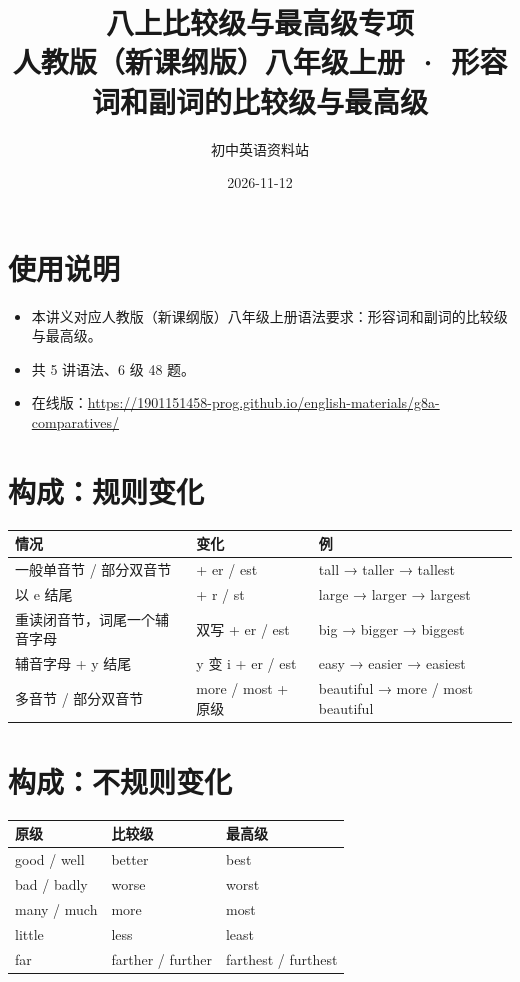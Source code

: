 \documentclass[11pt,a4paper]{ctexart}
\title{\textbf{八上比较级与最高级专项}\\[4pt]
\large 人教版（新课纲版）八年级上册 · 形容词和副词的比较级与最高级}
\author{初中英语资料站}
\date{2026-11-12}
\begin{document}
\maketitle

\section*{使用说明}
\begin{itemize}[leftmargin=1.4em]
\item 本讲义对应人教版（新课纲版）八年级上册语法要求：形容词和副词的比较级与最高级。
\item 共 5 讲语法、6 级 48 题。
\item 在线版：\url{https://1901151458-prog.github.io/english-materials/g8a-comparatives/}
\end{itemize}

\section{构成：规则变化}
\begin{center}
\begin{tabular}{p{4.4cm}p{4.0cm}p{5.2cm}}
\hline
\textbf{情况} & \textbf{变化} & \textbf{例}\\
\hline
一般单音节 / 部分双音节 & + er / est & tall → taller → tallest\\
以 e 结尾 & + r / st & large → larger → largest\\
重读闭音节，词尾一个辅音字母 & 双写 + er / est & big → bigger → biggest\\
辅音字母 + y 结尾 & y 变 i + er / est & easy → easier → easiest\\
多音节 / 部分双音节 & more / most + 原级 & beautiful → more / most beautiful\\
\hline
\end{tabular}
\end{center}

\section{构成：不规则变化}
\begin{center}
\begin{tabular}{p{4.4cm}p{4.4cm}p{4.4cm}}
\hline
\textbf{原级} & \textbf{比较级} & \textbf{最高级}\\
\hline
good / well & better & best\\
bad / badly & worse & worst\\
many / much & more & most\\
little & less & least\\
far & farther / further & farthest / furthest\\
\hline
\end{tabular}
\end{center}
\end{document}
